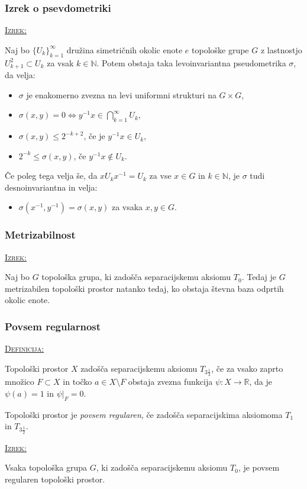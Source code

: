 \documentclass[a4paper, 12pt]{beamer}
\newenvironment{matematika}[1]{
\textcolor{bostonuniversityred}{\underline{\textsc{#1:}}}
}{
}
\begin{document}
\begin{frame}
\frametitle{Izrek o psevdometriki}
\begin{matematika}{Izrek}
	Naj bo $\{ U_k \}_{k=1}^{\infty}$ družina simetričnih okolic enote $e$ topo\-loš\-ke grupe $G$ z lastnostjo $U_{k+1}^2 \subset U_k$ za vsak $k\in\mathbb{N}$. Potem obstaja taka levoinvariantna pseudometrika $\sigma$, da velja:
	\begin{itemize}[label=]
		\item $\sigma$ je enakomerno zvezna na levi uniformni strukturi na $G \times G$,
		\item $\sigma (x, y) = 0 \iff y^{-1}x \in \bigcap_{k=1}^{\infty}U_k$,
		\item $\sigma (x, y) \leq 2^{-k+2}$, če je $y^{-1}x \in U_k$,
		\item $2^{-k} \leq \sigma (x, y)$, če $y^{-1}x \notin U_k$.
	\end{itemize}
	Če poleg tega velja še, da $x U_k x^{-1} = U_k$ za vse $x \in G$ in $k\in\mathbb{N}$, je $\sigma$ tudi desnoinvariantna in velja:
	\begin{itemize}[label=]
		\item $\sigma (x^{-1}, y^{-1}) = \sigma (x, y)$ za vsaka $x, y \in G$.
	\end{itemize}
\end{matematika}
\end{frame}

\begin{frame}
\frametitle{Metrizabilnost}
\begin{matematika}{Izrek}
Naj bo $G$ topološka grupa, ki zadošča separacijskemu aksiomu $T_0$. Tedaj je $G$ metrizabilen topološki prostor natanko tedaj, ko obstaja števna baza odprtih okolic enote.
\end{matematika}
\end{frame}

\begin{frame}
\frametitle{Povsem regularnost}
\begin{matematika}{Definicija}
Topološki prostor $X$ zadošča separacijskemu aksiomu $T_{3\frac{1}{2}}$, če za vsako zaprto množico $F \subset X$ in točko $a \in X \setminus F$ obstaja zvezna funkcija $\psi: X \to \mathbb{R}$, da je $\psi(a) = 1$ in $\psi|_F = 0$.
\end{matematika}\newline

Topološki prostor je \emph{povsem regularen}, če zadošča separacijskima aksiomoma $T_1$ in $T_{3\frac{1}{2}}$. \newline

\begin{matematika}{Izrek}
Vsaka topološka grupa $G$, ki zadošča separacijskemu aksiomu $T_0$, je povsem regularen topološki prostor.
\end{matematika}
\end{frame}
\end{document}
